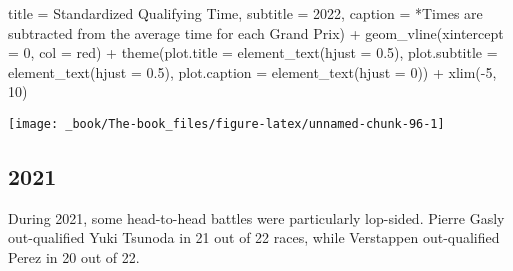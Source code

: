 \documentclass[
]{book}
\newenvironment{Shaded}{\begin{snugshade}}{\end{snugshade}}
\newcommand{\AttributeTok}[1]{\textcolor[rgb]{0.77,0.63,0.00}{#1}}
\newcommand{\DecValTok}[1]{\textcolor[rgb]{0.00,0.00,0.81}{#1}}
\newcommand{\FloatTok}[1]{\textcolor[rgb]{0.00,0.00,0.81}{#1}}
\newcommand{\FunctionTok}[1]{\textcolor[rgb]{0.00,0.00,0.00}{#1}}
\newcommand{\NormalTok}[1]{#1}
\newcommand{\SpecialCharTok}[1]{\textcolor[rgb]{0.00,0.00,0.00}{#1}}
\newcommand{\StringTok}[1]{\textcolor[rgb]{0.31,0.60,0.02}{#1}}
\begin{document}
\begin{Shaded}
\begin{Highlighting}[]
       \AttributeTok{title =} \StringTok{\textquotesingle{}Standardized Qualifying Time\textquotesingle{}}\NormalTok{,}
       \AttributeTok{subtitle =} \StringTok{\textquotesingle{}2022\textquotesingle{}}\NormalTok{,}
       \AttributeTok{caption =} \StringTok{\textquotesingle{}*Times are subtracted from the average time for each Grand Prix\textquotesingle{}}\NormalTok{) }\SpecialCharTok{+}
  \FunctionTok{geom\_vline}\NormalTok{(}\AttributeTok{xintercept =} \DecValTok{0}\NormalTok{, }\AttributeTok{col =} \StringTok{\textquotesingle{}red\textquotesingle{}}\NormalTok{) }\SpecialCharTok{+}
  \FunctionTok{theme}\NormalTok{(}\AttributeTok{plot.title =} \FunctionTok{element\_text}\NormalTok{(}\AttributeTok{hjust =} \FloatTok{0.5}\NormalTok{),}
        \AttributeTok{plot.subtitle =} \FunctionTok{element\_text}\NormalTok{(}\AttributeTok{hjust =} \FloatTok{0.5}\NormalTok{),}
        \AttributeTok{plot.caption =} \FunctionTok{element\_text}\NormalTok{(}\AttributeTok{hjust =} \DecValTok{0}\NormalTok{)) }\SpecialCharTok{+}
  \FunctionTok{xlim}\NormalTok{(}\SpecialCharTok{{-}}\DecValTok{5}\NormalTok{, }\DecValTok{10}\NormalTok{)}
\end{Highlighting}
\end{Shaded}

\begin{center}\texttt{[image: \_book/The-book\_files/figure-latex/unnamed-chunk-96-1]} \end{center}

\hypertarget{section-2}{%
\subsection{2021}\label{section-2}}

During 2021, some head-to-head battles were particularly lop-sided. Pierre Gasly out-qualified Yuki Tsunoda in 21 out of 22 races, while Verstappen out-qualified Perez in 20 out of 22.
\end{document}
